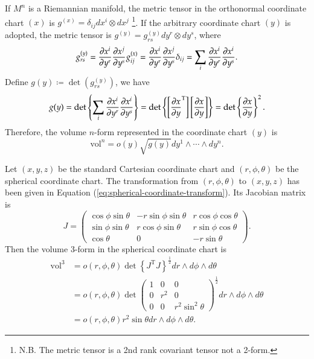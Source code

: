 \documentclass[11pt, a4paper]{book}
\begin{document}
If $M^n$ is a Riemannian manifold, the metric tensor in the orthonormal coordinate chart
$(x)$ is $g^{(x)} = \delta_{ij} dx^i \otimes dx^j$ \footnote{N.B. The metric tensor is a
  2nd rank covariant tensor not a 2-form.}. If the arbitrary coordinate chart $(y)$
is adopted, the metric tensor is $g^{(y)} = g_{rs}^{(y)} dy^r \otimes dy^s$, where
\begin{equation*}
  g_{rs}^{(y)} = \frac{\partial x^i}{\partial y^r} \frac{\partial x^j}{\partial y^s} g_{ij}^{(x)}
  = \frac{\partial x^i}{\partial y^r} \frac{\partial x^j}{\partial y^s} \delta_{ij} = \sum_i
  \frac{\partial x^i}{\partial y^r} \frac{\partial x^i}{\partial y^s}.
\end{equation*}
Define $g(y) \coloneqq \det(g_{rs}^{(y)})$, we have
\begin{equation*}
  g(y) = \det \left\{ \sum_i
    \frac{\partial x^i}{\partial y^r} \frac{\partial x^i}{\partial y^s} \right\} = \det \left\{
    \left[ \frac{\partial x}{\partial y}^{\mathrm{T}} \right] \left[ \frac{\partial x}{\partial y}
    \right] \right\} = \det \left\{ \frac{\partial x}{\partial y} \right\}^2.
\end{equation*}
Therefore, the volume $n$-form represented in the coordinate chart $(y)$ is
\begin{equation}
  \mathrm{vol}^n = o(y) \sqrt{g(y)} dy^1 \wedge\cdots\wedge dy^n.
\end{equation}

\begin{Example}
  Let $(x,y,z)$ be the standard Cartesian coordinate chart and $(r, \phi, \theta)$ be the
  spherical coordinate chart. The transformation from $(r, \phi, \theta)$ to $(x,y,z)$ has
  been given in Equation (\ref{eq:spherical-coordinate-transform}). Its Jacobian matrix is
  \begin{equation}
    J = \begin{pmatrix}
      \cos\phi\sin\theta & -r\sin\phi \sin\theta & r\cos\phi \cos\theta \\
      \sin\phi\sin\theta & r\cos\phi \sin\theta & r \sin\phi \cos\theta \\
      \cos\theta & 0 & -r\sin\theta
    \end{pmatrix}.
  \end{equation}
  Then the volume 3-form in the spherical coordinate chart is
  \begin{equation}
    \begin{aligned}
      \mathrm{vol}^3 &= o(r,\phi,\theta) \det \left\{ J^{\mathrm{T}} J
      \right\}^{\frac{1}{2}} dr \wedge d\phi \wedge d\theta \\
      &= o(r,\phi,\theta) \det \begin{pmatrix}
        1 & 0 & 0 \\
        0 & r^2 & 0 \\
        0 & 0 & r^2\sin^2\theta
      \end{pmatrix}^{\frac{1}{2}} dr \wedge d\phi \wedge d\theta \\
      & = o(r,\phi,\theta) r^2\sin\theta dr \wedge d\phi \wedge d\theta.
    \end{aligned}
  \end{equation}
\end{Example}
\end{document}
